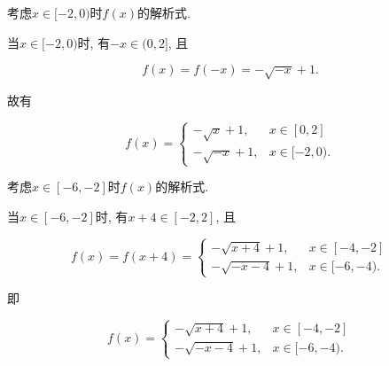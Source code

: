 \documentclass[8pt]{article}
\begin{document}
\begin{enumerate}[label=\arabic*.]
\begin{enumerate}[label=(\arabic*)]
					考虑$x\in[-2, 0)$时$f(x)$的解析式.

					当$x\in [-2, 0)$时, 有$-x \in (0, 2]$, 且

					$$f(x)=f(-x)=-\sqrt{-x}+1.$$

					故有

					$$f(x)=\left\{\begin{array}{rcl}-\sqrt{x}+1, &x\in[0, 2]\\-\sqrt{-x}+1, &x\in[-2, 0).\end{array}\right.$$

					考虑$x\in[-6, -2]$时$f(x)$的解析式.

					当$x\in [-6, -2]$时, 有$x+4 \in [-2, 2]$, 且

					$$f(x)=f(x+4)=\left\{\begin{array}{rcl}-\sqrt{x+4}+1, &x\in[-4, -2]\\-\sqrt{-x-4}+1, &x\in[-6, -4).\end{array}\right.$$

					即

					$$f(x)=\left\{\begin{array}{rcl}-\sqrt{x+4}+1, &x\in[-4, -2]\\-\sqrt{-x-4}+1, &x\in[-6, -4).\end{array}\right.$$

	    	\end{enumerate}

	\end{enumerate}
\end{document}
